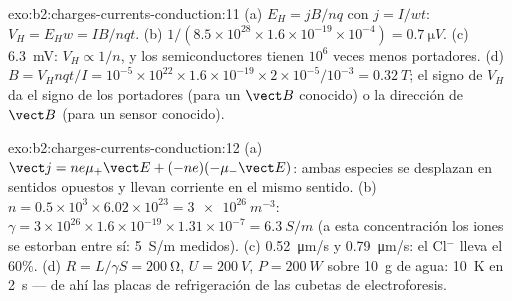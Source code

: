\begin{solution}{exo:b2:charges-currents-conduction:11}
(a) $E_H = jB/nq$ con $j = I/wt$: $V_H = E_Hw = IB/nqt$. (b) $1/(8.5 \times 10^{28}
\times 1.6 \times 10^{-19} \times 10^{-4}) = \qty{0.7}{\micro V}$. (c) \qty{6.3}{mV}: $V_H \propto 1/n$,
y los semiconductores tienen $10^6$ veces menos portadores. (d) $B = V_Hnqt/I =
10^{-5} \times 10^{22} \times 1.6 \times 10^{-19} \times 2 \times 10^{-5}/10^{-3} = \qty{0.32}{T}$; el signo
de $V_H$ da el signo de los portadores (para un $\vect B$ conocido) o la
dirección de $\vect B$ (para un sensor conocido).
\end{solution}

\begin{solution}{exo:b2:charges-currents-conduction:12}
(a) $\vect j = ne\mu_+\vect E + (-ne)(-\mu_-\vect E)$: ambas especies se
desplazan en sentidos opuestos y llevan corriente en el mismo sentido. (b) $n =
0.5 \times 10^3 \times 6.02 \times 10^{23} = \qty{3e26}{m^{-3}}$: $\gamma = 3 \times 10^{26} \times 1.6 \times 10^{-19}
\times 1.31 \times 10^{-7} = \qty{6.3}{S/m}$ (a esta concentración los iones se
estorban entre sí: \qty{5}{S/m} medidos). (c) \qty{0.52}{\micro m/s} y \qty{0.79}{\micro m/s}:
el Cl$^-$ lleva el $60\%$. (d) $R = L/\gamma S = \qty{200}{\ohm}$, $U = \qty{200}{V}$, $P =
\qty{200}{W}$ sobre \qty{10}{g} de agua: \qty{10}{K} en \qty{2}{s} --- de ahí las
placas de refrigeración de las cubetas de electroforesis.
\end{solution}

